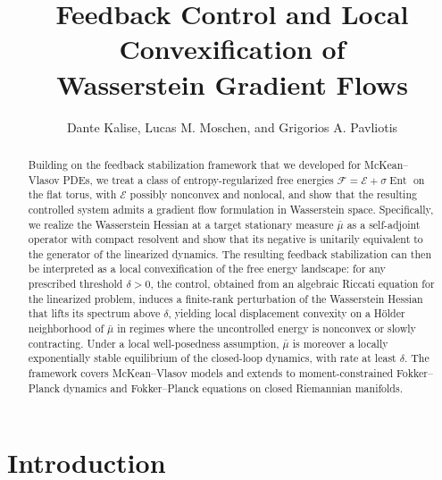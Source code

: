 \documentclass[11pt]{article}
\numberwithin{equation}{section}
\theoremstyle{definition}
\newcommand{\F}{\mathcal{F}}
\newcommand{\E}{\mathcal{E}}
\newcommand{\Ent}{\operatorname{Ent}}
\begin{document}
\title{Feedback Control and Local Convexification of \\ Wasserstein Gradient Flows}
\author{Dante Kalise, Lucas M. Moschen, and Grigorios A. Pavliotis}
\date{}
\maketitle

\begin{abstract}
    Building on the feedback stabilization framework that we developed for McKean--Vlasov PDEs, we treat a class of entropy-regularized free energies $\F = \E + \sigma\Ent$ on the flat torus, with $\E$ possibly nonconvex and nonlocal, and show that the resulting controlled system admits a gradient flow formulation in Wasserstein space.
    Specifically, we realize the Wasserstein Hessian at a target stationary measure $\bar\mu$ as a self-adjoint operator with compact resolvent and show that its negative is unitarily equivalent to the generator of the linearized dynamics.
    The resulting feedback stabilization can then be interpreted as a local convexification of the free energy landscape: for any prescribed threshold $\delta > 0$, the control, obtained from an algebraic Riccati equation for the linearized problem, induces a finite-rank perturbation of the Wasserstein Hessian that lifts its spectrum above $\delta$, yielding local displacement convexity on a H\"older neighborhood of $\bar\mu$ in regimes where the uncontrolled energy is nonconvex or slowly contracting.
    Under a local well-posedness assumption, $\bar\mu$ is moreover a locally exponentially stable equilibrium of the closed-loop dynamics, with rate at least $\delta$.
    The framework covers McKean--Vlasov models and extends to moment-constrained Fokker--Planck dynamics and Fokker--Planck equations on closed Riemannian manifolds.
\end{abstract}

\section{Introduction}
\label{sec:introduction}
\end{document}
